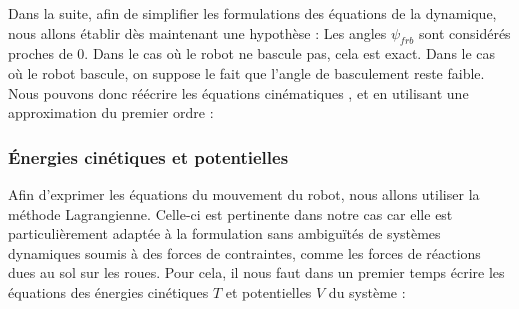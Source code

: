 					Dans la suite, afin de simplifier les formulations des équations de la dynamique, nous allons établir dès maintenant une hypothèse : Les angles $\psi_{frb}$ sont considérés proches de $0$.
					Dans le cas où le robot ne bascule pas, cela est exact. Dans le cas où le robot bascule, on suppose le fait que l'angle de basculement reste faible.
					Nous pouvons donc réécrire les équations cinématiques ,  et  en utilisant une approximation du premier ordre :

			
			\subsubsection{Énergies cinétiques et potentielles}
			
				\label{section.contrainte_basculement}
				
					Afin d'exprimer les équations du mouvement du robot, nous allons utiliser la méthode Lagrangienne.
					Celle-ci est pertinente dans notre cas car elle est particulièrement adaptée à la formulation sans ambiguïtés de systèmes dynamiques soumis à des forces de contraintes, comme les forces de réactions dues au sol sur les roues. 
					Pour cela, il nous faut dans un premier temps écrire les équations des énergies cinétiques $T$ et potentielles $V$ du système :
					
